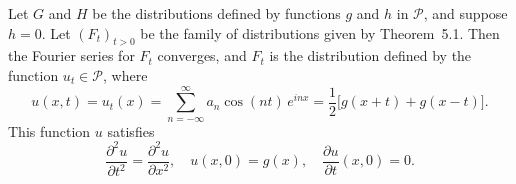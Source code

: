 \begin{corollary}
Let $G$ and $H$ be the distributions defined by functions $g$ and $h$ in $\mathcal{P}$, and suppose $h = 0$. Let $(F_t)_{t>0}$ be the family of distributions given by Theorem~5.1. Then the Fourier series for $F_t$ converges, and $F_t$ is the distribution defined by the function $u_t \in \mathcal{P}$, where
$$
u(x, t) = u_t(x) = \sum_{n=-\infty}^{\infty} a_n \cos(nt) \, e^{inx}
= \frac{1}{2}\bigl[g(x+t) + g(x-t)\bigr].
$$
This function $u$ satisfies
$$
\frac{\partial^2 u}{\partial t^2} = \frac{\partial^2 u}{\partial x^2}, \quad
u(x, 0) = g(x), \quad
\frac{\partial u}{\partial t}(x, 0) = 0.
$$
\end{corollary}
